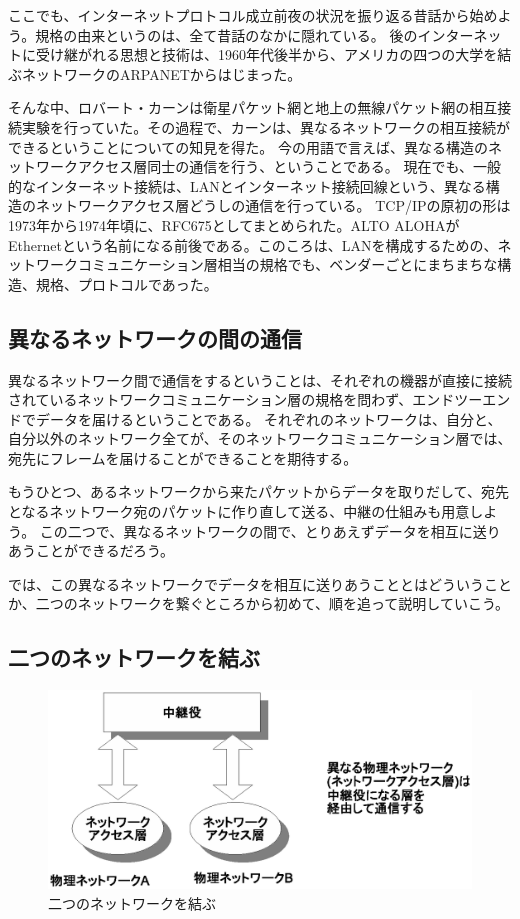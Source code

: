 ここでも、インターネットプロトコル成立前夜の状況を振り返る昔話から始めよう。規格の由来というのは、全て昔話のなかに隠れている。
後のインターネットに受け継がれる思想と技術は、1960年代後半から、アメリカの四つの大学を結ぶネットワークのARPANETからはじまった。

そんな中、ロバート・カーンは衛星パケット網と地上の無線パケット網の相互接続実験を行っていた。その過程で、カーンは、異なるネットワークの相互接続ができるということについての知見を得た。
今の用語で言えば、異なる構造のネットワークアクセス層同士の通信を行う、ということである。
現在でも、一般的なインターネット接続は、LANとインターネット接続回線という、異なる構造のネットワークアクセス層どうしの通信を行っている。
TCP/IPの原初の形は1973年から1974年頃に、RFC675としてまとめられた。ALTO ALOHAがEthernetという名前になる前後である。このころは、LANを構成するための、ネットワークコミュニケーション層相当の規格でも、ベンダーごとにまちまちな構造、規格、プロトコルであった。

\subsection{異なるネットワークの間の通信}

異なるネットワーク間で通信をするということは、それぞれの機器が直接に接続されているネットワークコミュニケーション層の規格を問わず、エンドツーエンドでデータを届けるということである。
それぞれのネットワークは、自分と、自分以外のネットワーク全てが、そのネットワークコミュニケーション層では、宛先にフレームを届けることができることを期待する。

もうひとつ、あるネットワークから来たパケットからデータを取りだして、宛先となるネットワーク宛のパケットに作り直して送る、中継の仕組みも用意しよう。
この二つで、異なるネットワークの間で、とりあえずデータを相互に送りあうことができるだろう。

では、この異なるネットワークでデータを相互に送りあうこととはどういうことか、二つのネットワークを繋ぐところから初めて、順を追って説明していこう。

\subsection{二つのネットワークを結ぶ}

\begin{figure}[htbp]
	\includegraphics[width=12cm,clip]{draw/ip_basic2.eps}
	\caption{二つのネットワークを結ぶ}
	\label{fig:ip_basic2}
\end{figure}


